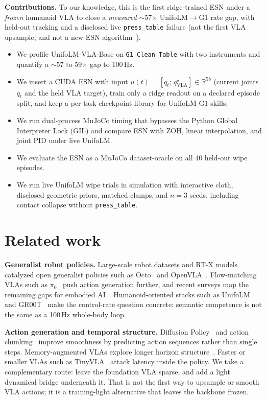 \documentclass{article}
\begin{document}
\textbf{Contributions.}
To our knowledge, this is the first ridge-trained ESN under a \emph{frozen} humanoid VLA to close a \emph{measured} $\sim$57$\times$ UnifoLM$\rightarrow$G1 rate gap, with held-out tracking and a disclosed live \texttt{press\_table} failure (not the first VLA upsample, and not a new ESN algorithm~\cite{Jaeger2001,Ihimekpen2026}).
\begin{itemize}[leftmargin=1.15em,itemsep=0.2em,topsep=0.3em]
  \item We profile UnifoLM-VLA-Base on \texttt{G1\_Clean\_Table} with two instruments and quantify a $\sim$57 to 59$\times$ gap to 100\,Hz.
  \item We insert a CUDA ESN with input $u(t)=[q_t;\,q^{\star}_{\mathrm{VLA}}]\in\mathbb{R}^{58}$ (current joints $q_t$ and the held VLA target), train only a ridge readout on a declared episode split, and keep a per-task checkpoint library for UnifoLM G1 skills.
  \item We run dual-process MuJoCo timing that bypasses the Python Global Interpreter Lock (GIL) and compare ESN with ZOH, linear interpolation, and joint PID under live UnifoLM.
  \item We evaluate the ESN as a MuJoCo dataset-oracle on all 40 held-out wipe episodes.
  \item We run live UnifoLM wipe trials in simulation with interactive cloth, disclosed geometric priors, matched clamps, and $n{=}3$ seeds, including contact collapse without \texttt{press\_table}.
\end{itemize}

\section{Related work}
\textbf{Generalist robot policies.}
Large-scale robot datasets and RT-X models~\cite{OpenXEmbodiment2024} catalyzed open generalist policies such as Octo~\cite{Octo2024} and OpenVLA~\cite{OpenVLA2025}.
Flow-matching VLAs such as $\pi_0$~\cite{PiZero2024} push action generation further, and recent surveys map the remaining gaps for embodied AI~\cite{MaVLASurvey2024,PhysicalAI2025}.
Humanoid-oriented stacks such as UnifoLM~\cite{UnifoLM2026} and GR00T~\cite{GR00T2025} make the control-rate question concrete: semantic competence is not the same as a 100\,Hz whole-body loop.

\textbf{Action generation and temporal structure.}
Diffusion Policy~\cite{DiffusionPolicy2023} and action chunking~\cite{ACT2023} improve smoothness by predicting action sequences rather than single steps.
Memory-augmented VLAs explore longer horizon structure~\cite{Notes2Self2026}.
Faster or smaller VLAs such as TinyVLA~\cite{TinyVLA2024} attack latency inside the policy.
We take a complementary route: leave the foundation VLA sparse, and add a light dynamical bridge underneath it.
That is not the first way to upsample or smooth VLA actions; it is a training-light alternative that leaves the backbone frozen.
\end{document}
